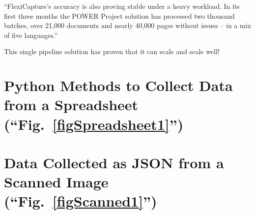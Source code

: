 \documentclass[conference]{IEEEtran}
\begin{document}
``FlexiCapture's accuracy is also proving stable under a heavy workload. In its first three months the POWER Project solution has processed two thousand batches, over 21,000 documents and nearly 40,000 pages without issues – in a mix of five languages.'' \cite{pepsico}

This single pipeline solution has proven that it can scale and scale well!




\onecolumn
\appendices
\section{Python Methods to Collect Data from a Spreadsheet (``Fig.~\ref{figSpreadsheet1}'')}

\section{Data Collected as JSON from a Scanned Image (``Fig.~\ref{figScanned1}'')}
\end{document}
